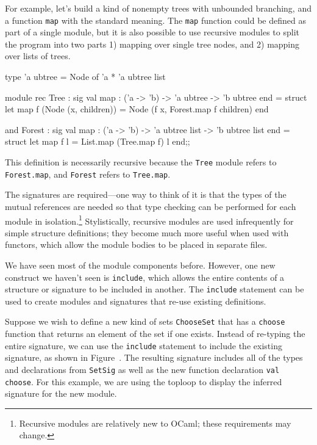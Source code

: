 For example, let's build a kind of nonempty trees with unbounded
branching, and a function \hbox{\lstinline$map$} with the standard
meaning.  The \hbox{\lstinline$map$} function could be defined as part
of a single module, but it is also possible to use recursive modules
to split the program into two parts 1) mapping over single tree nodes,
and 2) mapping over lists of trees.

\begin{ocaml}
type 'a ubtree = Node of 'a * 'a ubtree list

module rec Tree : sig
   val map : ('a -> 'b) -> 'a ubtree -> 'b ubtree
end = struct
   let map f (Node (x, children)) =
      Node (f x, Forest.map f children)
end

and Forest : sig
   val map : ('a -> 'b) -> 'a ubtree list -> 'b ubtree list
end = struct
   let map f l =
      List.map (Tree.map f) l
end;;
\end{ocaml}
%
This definition is necessarily recursive because
the \hbox{\lstinline$Tree$} module refers
to \hbox{\lstinline$Forest.map$}, and \hbox{\lstinline$Forest$} refers
to \hbox{\lstinline$Tree.map$}.

The signatures are required---one way to think of it is that the types
of the mutual references are needed so that type checking can be
performed for each module in isolation.\footnote{Recursive modules are
relatively new to OCaml; these requirements may change.}
Stylistically, recursive modules are used infrequently for simple
structure definitions; they become much more useful when used with
functors, which allow the module bodies to be placed in separate
files.


\label{keyword:include}
We have seen most of the module components before.  However, one new
construct we haven't seen is \hbox{\lstinline/include/}, which allows
the entire contents of a structure or signature to be included in
another.  The \hbox{\lstinline/include/} statement can be used to
create modules and signatures that re-use existing definitions.


Suppose we wish to define a new kind of sets \hbox{\lstinline/ChooseSet/} that has a
\hbox{\lstinline/choose/} function that returns an element of the set if one exists. Instead of
re-typing the entire signature, we can use the \hbox{\lstinline/include/} statement to include the
existing signature, as shown in Figure~. The resulting signature includes all of
the types and declarations from \hbox{\lstinline/SetSig/} as well as the new function declaration
\hbox{\lstinline/val choose/}. For this example, we are using the toploop to display the inferred
signature for the new module.

